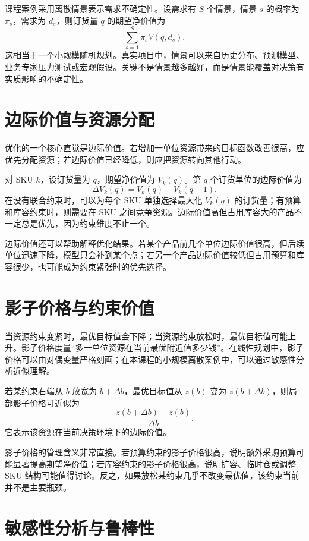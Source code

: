 \documentclass[UTF8,fontset=fandol,openany,zihao=-4]{ctexbook}
\begin{document}
课程案例采用离散情景表示需求不确定性。设需求有 \(S\) 个情景，情景 \(s\) 的概率为 \(\pi_s\)，需求为 \(d_s\)，则订货量 \(q\) 的期望净价值为
\[
  \sum_{s=1}^{S}\pi_s V(q,d_s).
\]
这相当于一个小规模随机规划。真实项目中，情景可以来自历史分布、预测模型、业务专家压力测试或宏观假设。关键不是情景越多越好，而是情景能覆盖对决策有实质影响的不确定性。

\section{边际价值与资源分配}

优化的一个核心直觉是边际价值。若增加一单位资源带来的目标函数改善很高，应优先分配资源；若边际价值已经降低，则应把资源转向其他行动。

对 SKU \(k\)，设订货量为 \(q\)，期望净价值为 \(V_k(q)\)。第 \(q\) 个订货单位的边际价值为
\[
  \Delta V_k(q)=V_k(q)-V_k(q-1).
\]
在没有联合约束时，可以为每个 SKU 单独选择最大化 \(V_k(q)\) 的订货量；有预算和库容约束时，则需要在 SKU 之间竞争资源。边际价值高但占用库容大的产品不一定总是优先，因为约束维度不止一个。

边际价值还可以帮助解释优化结果。若某个产品前几个单位边际价值很高，但后续单位迅速下降，模型只会补到某个点；若另一个产品边际价值较低但占用预算和库容很少，也可能成为约束紧张时的优先选择。

\section{影子价格与约束价值}

当资源约束变紧时，最优目标值会下降；当资源约束放松时，最优目标值可能上升。影子价格度量“多一单位资源在当前最优附近值多少钱”。在线性规划中，影子价格可以由对偶变量严格刻画；在本课程的小规模离散案例中，可以通过敏感性分析近似理解。

\begin{definition}[影子价格]
若某约束右端从 \(b\) 放宽为 \(b+\Delta b\)，最优目标值从 \(z(b)\) 变为 \(z(b+\Delta b)\)，则局部影子价格可近似为
\[
  \frac{z(b+\Delta b)-z(b)}{\Delta b}.
\]
它表示该资源在当前决策环境下的边际价值。
\end{definition}

影子价格的管理含义非常直接。若预算约束的影子价格很高，说明额外采购预算可能显著提高期望净价值；若库容约束的影子价格很高，说明扩容、临时仓或调整 SKU 结构可能值得讨论。反之，如果放松某约束几乎不改变最优值，该约束当前并不是主要瓶颈。

\section{敏感性分析与鲁棒性}
\end{document}
